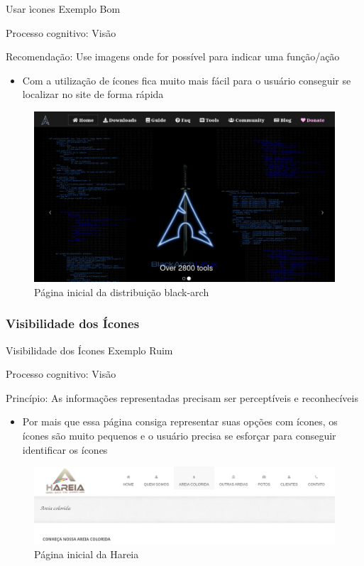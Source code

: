 \documentclass{beamer}
\begin{document}
\begin{frame}{Usar ìcones Exemplo Bom}

Processo cognitivo: Visão

Recomendação: Use imagens onde for possível para indicar uma função/ação

\begin{itemize}
    \item Com a utilização de ícones fica muito mais fácil para o usuário conseguir se localizar no site de forma rápida
\end{itemize}
\begin{figure}
    \centering
    \includegraphics[scale=0.3]{images/black-arch-install.png}
    \caption{Página inicial da distribuição black-arch}
\end{figure}

\end{frame}

\subsubsection{Visibilidade dos Ícones}
\begin{frame}{Visibilidade dos Ícones Exemplo Ruim}

Processo cognitivo: Visão

Princípio: As informações representadas precisam ser perceptíveis e reconhecíveis

\begin{itemize}
    \item Por mais que essa página consiga representar suas opções com ícones, os ícones são muito pequenos e o usuário precisa se esforçar para conseguir identificar os ícones
\end{itemize}
\begin{figure}
    \centering
    \includegraphics[scale=0.3]{images/hareia-icones.png}
    \caption{Página inicial da Hareia}
\end{figure}

\end{frame}
\end{document}

